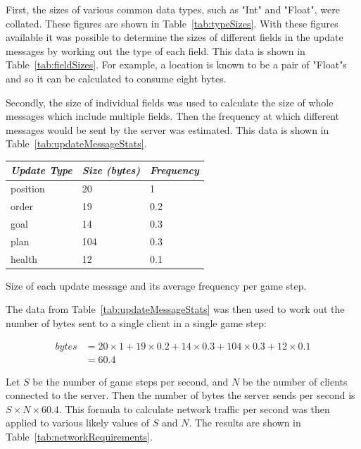 First, the sizes of various common data types, such as "Int" and "Float", were collated. These figures are shown in Table~\ref{tab:typeSizes}. With these figures available it was possible to determine the sizes of different fields in the update messages by working out the type of each field. This data is shown in Table~\ref{tab:fieldSizes}. For example, a location is known to be a pair of "Float"s and so it can be calculated to consume eight bytes.


Secondly, the size of individual fields was used to calculate the size of whole messages which include multiple fields. Then the frequency at which different messages would be sent by the server was estimated. This data is shown in Table~\ref{tab:updateMessageStats}.

\begin{margintable}
    \begin{tabular}{p{5em} p{5em} p{5em}}
    \toprule
    \emph{Update Type} & \emph{Size (bytes)} & \emph{Frequency} \\
    \midrule
    position & 20 & 1 \\ 
    order & 19 & 0.2 \\
    goal & 14 & 0.3 \\
    plan & 104 & 0.3 \\
    health & 12 & 0.1 \\   
    \bottomrule
    \end{tabular}
    	\vspace{1em}
	\caption[Update message statistics]{Size of each update message and its average frequency per game step.}
	\label{tab:updateMessageStats}
\end{margintable}

The data from Table~\ref{tab:updateMessageStats} was then used to work out the number of bytes sent to a single client in a single game step:

\begin{align*}
bytes &= 20 \times 1 + 19 \times 0.2 + 14 \times 0.3 + 104 \times 0.3 + 12 \times 0.1 \\
      &= 60.4
\end{align*}

Let $S$ be the number of game steps per second, and $N$ be the number of clients connected to the server. Then the number of bytes the server sends per second is $S \times N \times 60.4$. This formula to calculate network traffic per second was then applied to various likely values of $S$ and $N$. The results are shown in Table~\ref{tab:networkRequirements}.

